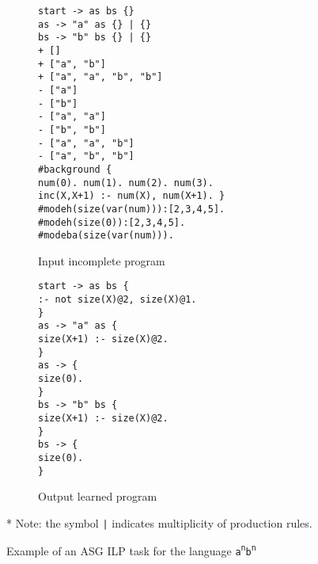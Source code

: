 \begin{figure}[H]
\centering
\begin{subfigure}{0.55\textwidth}
\texttt{start -> as bs \{\} \\
as -> "a" as \{\} | \{\} \\
bs -> "b" bs \{\} | \{\} \\
\newline
+ [] \\
+ ["a", "b"] \\
+ ["a", "a", "b", "b"] \\
- ["a"] \\
- ["b"] \\
- ["a", "a"] \\
- ["b", "b"] \\
- ["a", "a", "b"] \\
- ["a", "b", "b"] \\
\newline
\#background \{ \\
num(0). num(1). num(2). num(3). \\
inc(X,X+1) :- num(X), num(X+1). \} \\
\newline
\#modeh(size(var(num))):[2,3,4,5]. \\
\#modeh(size(0)):[2,3,4,5]. \\
\#modeba(size(var(num))). \\}
\caption{Input incomplete program}
\end{subfigure}
\begin{subfigure}{0.44\textwidth}
\texttt{start -> as bs \{ \\
\phantom{ }:- not size(X)@2, size(X)@1. \\
\} \\
\newline
as -> "a" as \{ \\
\phantom{ }size(X+1) :- size(X)@2. \\
\} \\
\newline
as -> \{ \\
\phantom{ }size(0). \\
\} \\
\newline
bs -> "b" bs \{ \\
\phantom{ }size(X+1) :- size(X)@2. \\
\} \\
\newline
bs -> \{ \\
\phantom{ }size(0). \\
\}} \\
\caption{Output learned program}
\end{subfigure}
\newline
\newline
* Note: the symbol \texttt{|} indicates multiplicity of production rules.
\caption{Example of an ASG ILP task for the language \texttt{a\textsuperscript{n}b\textsuperscript{n}}}
\label{fig:asg_ilp_example}
\end{figure}

